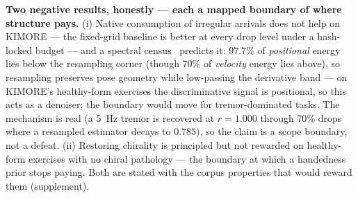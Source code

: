 \documentclass[10pt,twocolumn,letterpaper]{article}
\begin{document}
\textbf{Two negative results, honestly --- each a mapped boundary of where structure pays.} (i) Native
consumption of irregular arrivals does not help on
KIMORE --- the fixed-grid baseline is better at every drop level under a hash-locked budget --- and a
spectral census~\cite{vanderplas2018lombscargle} predicts it: $97.7\%$ of \emph{positional} energy lies
below the resampling corner (though $70\%$ of \emph{velocity} energy lies above), so resampling
preserves pose geometry while low-passing the derivative band --- on KIMORE's healthy-form exercises
the discriminative signal is positional, so this acts as a denoiser; the boundary would move for
tremor-dominated tasks. The mechanism is real (a $5$~Hz
tremor is recovered at $r{=}1.000$ through $70\%$ drops where a resampled estimator decays to $0.785$),
so the claim is a scope boundary, not a defeat. (ii) Restoring chirality is principled but not rewarded
on healthy-form exercises with no chiral pathology --- the boundary at which a handedness prior stops
paying. Both are stated with the corpus properties that
would reward them (supplement).

\end{document}
